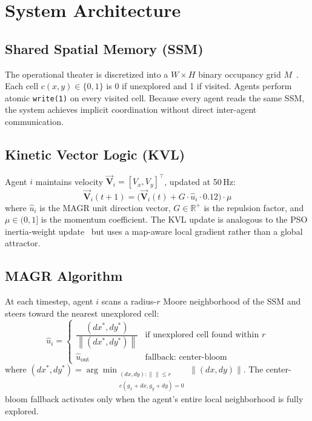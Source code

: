 \documentclass[journal,twoside,letterpaper]{IEEEtran}
\newcommand{\vecc}[1]{\vec{\mathbf{#1}}}
\newcommand{\norm}[1]{\left\lVert#1\right\rVert}
\newcommand{\vecc}[1]{\vec{\mathbf{#1}}}
\newcommand{\norm}[1]{\left\lVert#1\right\rVert}
\begin{document}
\section{System Architecture}

\subsection{Shared Spatial Memory (SSM)}

The operational theater is discretized into a $W \times H$ binary occupancy grid
$M$~\cite{moravec1985,elfes1989}. Each cell $c(x,y) \in \{0,1\}$ is 0 if
unexplored and 1 if visited. Agents perform atomic \texttt{write(1)} on every
visited cell. Because every agent reads the same SSM, the system achieves implicit
coordination without direct inter-agent communication.

\subsection{Kinetic Vector Logic (KVL)}

Agent $i$ maintains velocity $\vecc{V}_i = [V_x, V_y]^\top$, updated at 50\,Hz:
\begin{equation}
    \vecc{V}_{i}(t+1) = \bigl(\vecc{V}_{i}(t) + G\cdot\hat{u}_i\cdot 0.12\bigr)\cdot\mu
    \label{eq:kvl}
\end{equation}
where $\hat{u}_i$ is the MAGR unit direction vector, $G \in \mathbb{R}^+$ is the
repulsion factor, and $\mu \in (0,1]$ is the momentum coefficient. The KVL
update is analogous to the PSO inertia-weight update~\cite{kennedy1995} but
uses a map-aware local gradient rather than a global attractor.

\subsection{MAGR Algorithm}

At each timestep, agent $i$ scans a radius-$r$ Moore neighborhood of the SSM
and steers toward the nearest unexplored cell:
\begin{equation}
    \hat{u}_i = \begin{cases}
        \dfrac{(dx^*,dy^*)}{\norm{(dx^*,dy^*)}}
            & \text{if unexplored cell found within }r \\[6pt]
        \hat{u}_{\text{out}} & \text{fallback: center-bloom}
    \end{cases}
    \label{eq:magr}
\end{equation}
where $(dx^*, dy^*) = \arg\min_{\substack{(dx,dy):\norm{}\leq r\\c(g_x+dx,g_y+dy)=0}}\norm{(dx,dy)}$.
The center-bloom fallback activates only when the agent's entire local
neighborhood is fully explored.
\end{document}
